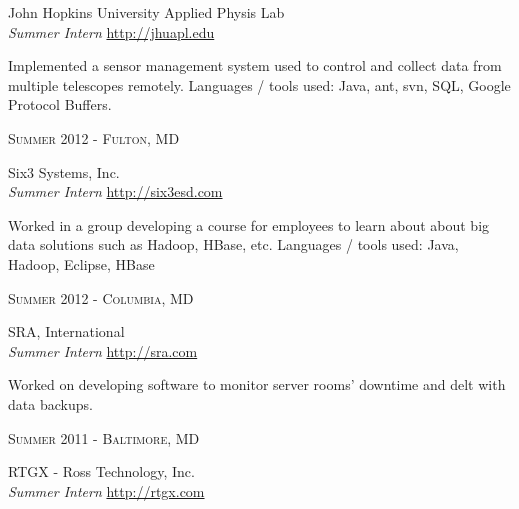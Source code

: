 \documentclass[10pt]{article} %
\begin{document}
{\begin{minipage}[t]{0.5\textwidth}
{\raggedright\large John Hopkins University Applied Physis Lab \\
\textit{Summer Intern}  \hfill {\small \href{http://jhuapl.edu}{http://jhuapl.edu}}\\ [5pt]}

\normalsize{Implemented a sensor management system used to control and collect data from multiple telescopes remotely. Languages / tools used: Java, ant, svn, SQL, Google Protocol Buffers.}\\


{\raggedleft\textsc{Summer 2012 - Fulton, MD}\par}

{\raggedright\large Six3 Systems, Inc. \\
\textit{Summer Intern} \hfill {\small \href{http://six3esd.com}{http://six3esd.com}} \\[5pt]}

\normalsize{Worked in a group developing a course for employees to learn about about big data solutions such as Hadoop, HBase, etc. Languages / tools used: Java, Hadoop, Eclipse, HBase}


{\raggedleft\textsc{Summer 2012 - Columbia, MD}\par}

{\raggedright\large SRA, International \\
\textit{Summer Intern} \hfill {\small \href{http://sra.com}{http://sra.com}} \\[5pt]}

\normalsize{Worked on developing software to monitor server rooms' downtime and delt with data backups.}\\


{\raggedleft\textsc{Summer 2011 - Baltimore, MD}\par}

{\raggedright\large RTGX - Ross Technology, Inc. \\
\textit{Summer Intern} \hfill {\small \href{http://rtgx.com}{http://rtgx.com}} \\[5pt]}


\end{minipage}}
\end{document}
